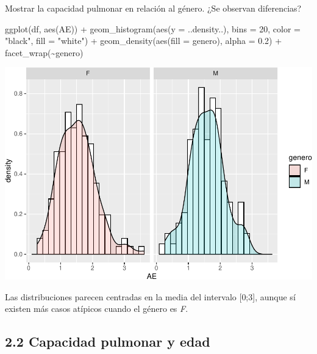 \documentclass[
]{article}
\newenvironment{Shaded}{\begin{snugshade}}{\end{snugshade}}
\newcommand{\AttributeTok}[1]{\textcolor[rgb]{0.77,0.63,0.00}{#1}}
\newcommand{\DecValTok}[1]{\textcolor[rgb]{0.00,0.00,0.81}{#1}}
\newcommand{\FloatTok}[1]{\textcolor[rgb]{0.00,0.00,0.81}{#1}}
\newcommand{\FunctionTok}[1]{\textcolor[rgb]{0.00,0.00,0.00}{#1}}
\newcommand{\NormalTok}[1]{#1}
\newcommand{\SpecialCharTok}[1]{\textcolor[rgb]{0.00,0.00,0.00}{#1}}
\newcommand{\StringTok}[1]{\textcolor[rgb]{0.31,0.60,0.02}{#1}}
\begin{document}
\vspace{0.3cm}

Mostrar la capacidad pulmonar en relación al género. ¿Se observan
diferencias?

\vspace{0.3cm}

\begin{Shaded}
\begin{Highlighting}[]
\FunctionTok{ggplot}\NormalTok{(df, }\FunctionTok{aes}\NormalTok{(AE)) }\SpecialCharTok{+} \FunctionTok{geom\_histogram}\NormalTok{(}\FunctionTok{aes}\NormalTok{(}\AttributeTok{y =}\NormalTok{ ..density..), }\AttributeTok{bins =} \DecValTok{20}\NormalTok{,}
    \AttributeTok{color =} \StringTok{"black"}\NormalTok{, }\AttributeTok{fill =} \StringTok{"white"}\NormalTok{) }\SpecialCharTok{+} \FunctionTok{geom\_density}\NormalTok{(}\FunctionTok{aes}\NormalTok{(}\AttributeTok{fill =}\NormalTok{ genero),}
    \AttributeTok{alpha =} \FloatTok{0.2}\NormalTok{) }\SpecialCharTok{+} \FunctionTok{facet\_wrap}\NormalTok{(}\SpecialCharTok{\textasciitilde{}}\NormalTok{genero)}
\end{Highlighting}
\end{Shaded}

\includegraphics{A4_files/figure-latex/unnamed-chunk-18-1.pdf}

\vspace{0.3cm}

Las distribuciones parecen centradas en la media del intervalo
{[}0;3{]}, aunque sí existen más casos atípicos cuando el género es
\emph{F}.

\vspace{0.3cm}

\hypertarget{capacidad-pulmonar-y-edad}{%
\subsection{2.2 Capacidad pulmonar y
edad}\label{capacidad-pulmonar-y-edad}}
\end{document}

